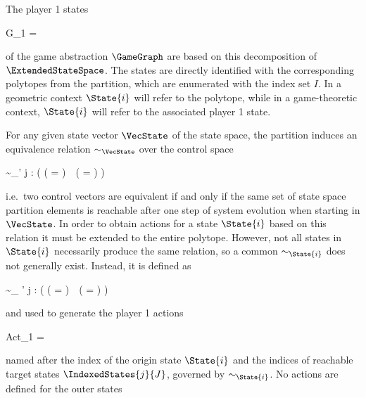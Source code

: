     The player 1 states

    \startformula
        G_1 = 
    \stopformula

    of the game abstraction $\GameGraph$ are based on this decomposition of $\ExtendedStateSpace$.
    The states are directly identified with the corresponding polytopes from the partition, which are enumerated with the index set $I$.
    In a geometric context $\State{i}$ will refer to the polytope, while in a game-theoretic context, $\State{i}$ will refer to the associated player 1 state.


    For any given state vector $\VecState$ of the state space, the partition induces an equivalence relation $\sim_\VecState$ over the control space

    \startformula
        \VecControl \sim_\VecState \VecControl' \;\Longleftrightarrow\;
        \forall j \in \StateIndices: \Big(
            ( \Posterior{\VecState}{\VecControl} \cap {} = \emptyset ) \,\leftrightarrow\,
            (  \cap {} = \emptyset )
        \Big) \EndComma
    \stopformula

    i.e.\ two control vectors are equivalent if and only if the same set of state space partition elements is reachable after one step of system evolution when starting in $\VecState$.
    In order to obtain actions for a state $\State{i}$ based on this relation it must be extended to the entire polytope.
    However, not all states in $\State{i}$ necessarily produce the same relation, so a common $\sim_{\State{i}}$ does not generally exist.
    Instead, it is defined as

    \startformula
        \VecControl \sim_{} \VecControl' \;\Longleftrightarrow\;
        \forall j \in \StateIndices: \Big(
            (  \cap {} = \emptyset ) \,\leftrightarrow\,
            (  \cap {} = \emptyset )
        \Big)
    \stopformula

    and used to generate the player 1 actions

    \startformula
        Act_1 =  \EndComma
    \stopformula

    named after the index of the origin state $\State{i}$ and the indices of reachable target states $\IndexedStates{j}{J}$, governed by $\sim_{\State{i}}$.
    No actions are defined for the outer states 


